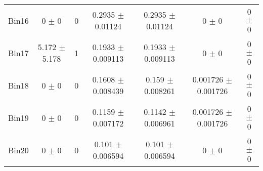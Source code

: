 \begin{tabular}{@{\extracolsep{4pt}}lcccccc@{}}
     Bin16 & 0 $\pm$ 0 & 0 & 0.2935 $\pm$ 0.01124 & 0.2935 $\pm$ 0.01124 & 0 $\pm$ 0 & 0 $\pm$ 0 \\ 
     Bin17 & 5.172 $\pm$ 5.178 & 1 & 0.1933 $\pm$ 0.009113 & 0.1933 $\pm$ 0.009113 & 0 $\pm$ 0 & 0 $\pm$ 0 \\ 
     Bin18 & 0 $\pm$ 0 & 0 & 0.1608 $\pm$ 0.008439 & 0.159 $\pm$ 0.008261 & 0.001726 $\pm$ 0.001726 & 0 $\pm$ 0 \\ 
     Bin19 & 0 $\pm$ 0 & 0 & 0.1159 $\pm$ 0.007172 & 0.1142 $\pm$ 0.006961 & 0.001726 $\pm$ 0.001726 & 0 $\pm$ 0 \\ 
     Bin20 & 0 $\pm$ 0 & 0 & 0.101 $\pm$ 0.006594 & 0.101 $\pm$ 0.006594 & 0 $\pm$ 0 & 0 $\pm$ 0 \\ 
\hline\hline
  \end{tabular}
